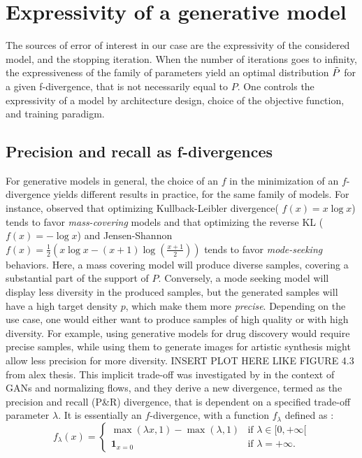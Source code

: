 \section{Expressivity of a generative model}
\label{sec:related:improve_generation}
The sources of error of interest in our case are the expressivity of the considered model, and the stopping iteration. When the number of iterations goes to infinity, the expressiveness of the family of parameters yield an optimal distribution $\Tilde{P}$ for a given f-divergence, that is not necessarily equal to $P$. One controls the expressivity of a model by architecture design, choice of the objective function, and training paradigm. 
\subsection{Precision and recall as f-divergences}\label{subsec:precision_recall}
For generative models in general, the choice of an $f$ in the minimization of an $f$-divergence yields different results in practice, for the same family of models. For instance, \citep{minka2005divergence} observed that optimizing Kullback-Leibler divergence( $f(x) = x \log x$) tends to favor \textit{mass-covering} models and that optimizing the reverse KL ($f(x) = -\log x$) and Jensen-Shannon $f(x) = \frac{1}{2}\left( x\log x - (x+1)\log \left( \frac{x+1}{2} \right) \right)$
tends to favor \textit{mode-seeking} behaviors. Here, a mass covering model will produce diverse samples, covering a substantial part of the support of $P$. Conversely, a mode seeking model will display less diversity in the produced samples, but the generated samples will have a high target density $p$, which make them more \textit{precise}.
Depending on the use case, one would either want to produce samples of high quality or with high diversity. For example, using generative models for drug discovery would require precise samples, while using them to generate images for artistic synthesis might allow less precision for more diversity. INSERT PLOT HERE LIKE FIGURE 4.3 from alex thesis. This implicit trade-off was investigated by \citep{verine2024precision} in the context of GANs and normalizing flows, and they derive a new divergence, termed as the precision and recall (P\&R) divergence, that is dependent on a specified trade-off parameter $\lambda$. It is essentially an $f$-divergence, with a function $f_{\lambda}$ defined as : 
\begin{equation}
  f_{\lambda}(x) =
  \begin{cases} 
    \max(\lambda x,1) - \max(\lambda,1) & \text{if } \lambda \in [0,+\infty[ \\
    \mathbf{1}_{x=0} & \text{if } \lambda = +\infty.
  \end{cases}
\end{equation}
